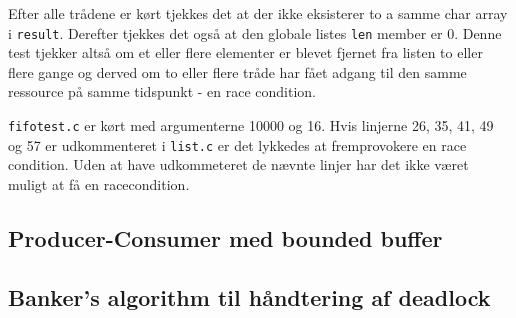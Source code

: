 Efter alle trådene er kørt tjekkes det at der ikke eksisterer to a samme char array i \texttt{result}. Derefter tjekkes det også at den globale listes \texttt{len} member er 0. Denne test tjekker altså om et eller flere elementer er blevet fjernet fra listen to eller flere gange og derved om to eller flere tråde har fået adgang til den samme ressource på samme tidspunkt - en race condition.

\texttt{fifotest.c} er kørt med argumenterne 10000 og 16. Hvis linjerne 26, 35, 41, 49 og 57 er udkommenteret i \texttt{list.c} er det lykkedes at fremprovokere en race condition. Uden at have udkommeteret de nævnte linjer har det ikke været muligt at få en racecondition.

\subsection{Producer-Consumer med bounded buffer}

\subsection{Banker's algorithm til håndtering af deadlock}
